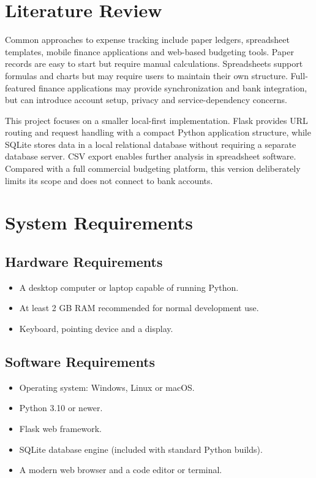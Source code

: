 \documentclass[11pt,a4paper]{report}
\begin{document}
\section{Literature Review}
Common approaches to expense tracking include paper ledgers, spreadsheet templates, mobile finance applications and web-based budgeting tools. Paper records are easy to start but require manual calculations. Spreadsheets support formulas and charts but may require users to maintain their own structure. Full-featured finance applications may provide synchronization and bank integration, but can introduce account setup, privacy and service-dependency concerns.

This project focuses on a smaller local-first implementation. Flask provides URL routing and request handling with a compact Python application structure, while SQLite stores data in a local relational database without requiring a separate database server. CSV export enables further analysis in spreadsheet software. Compared with a full commercial budgeting platform, this version deliberately limits its scope and does not connect to bank accounts.

\section{System Requirements}
\subsection{Hardware Requirements}
\begin{itemize}[leftmargin=*]
\item A desktop computer or laptop capable of running Python.
\item At least 2 GB RAM recommended for normal development use.
\item Keyboard, pointing device and a display.
\end{itemize}
\subsection{Software Requirements}
\begin{itemize}[leftmargin=*]
\item Operating system: Windows, Linux or macOS.
\item Python 3.10 or newer.
\item Flask web framework.
\item SQLite database engine (included with standard Python builds).
\item A modern web browser and a code editor or terminal.
\end{itemize}
\end{document}
